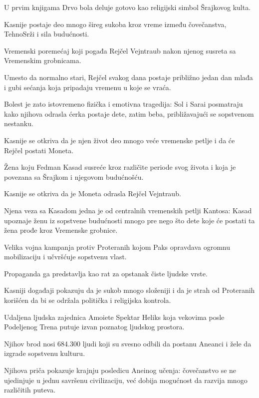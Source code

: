 \begin{description}
  U prvim knjigama Drvo bola deluje gotovo kao religijski simbol Šrajkovog kulta.

  Kasnije postaje deo mnogo šireg sukoba kroz vreme između čovečanstva, TehnoSrži i sila budućnosti.


  \item[Merlinova bolest]
  Vremenski poremećaj koji pogađa Rejčel Vejntraub nakon njenog susreta sa Vremenskim grobnicama.

  Umesto da normalno stari, Rejčel svakog dana postaje približno jedan dan mlađa i gubi sećanja koja pripadaju vremenu u koje se vraća.

  Bolest je zato istovremeno fizička i emotivna tragedija: Sol i Sarai posmatraju kako njihova odrasla ćerka postaje dete, zatim beba, približavajući se sopstvenom nestanku.

  Kasnije se otkriva da je njen život deo mnogo veće vremenske petlje i da će Rejčel postati Moneta.


  \item[Moneta]
  Žena koju Fedman Kasad susreće kroz različite periode svog života i koja je povezana sa Šrajkom i njegovom budućnošću.

  Kasnije se otkriva da je Moneta odrasla Rejčel Vejntraub.

  Njena veza sa Kasadom jedna je od centralnih vremenskih petlji Kantosa: Kasad upoznaje ženu iz sopstvene budućnosti mnogo pre nego što dete koje će postati ta žena prođe kroz Vremenske grobnice.


  \item[Krstaški rat Paksa]
  Velika vojna kampanja protiv Proteranih kojom Paks opravdava ogromnu mobilizaciju i učvršćuje sopstvenu vlast.

  Propaganda ga predstavlja kao rat za opstanak čiste ljudske vrste.

  Kasniji događaji pokazuju da je sukob mnogo složeniji i da je strah od Proteranih korišćen da bi se održala politička i religijska kontrola.


  \item[Siročad Heliksa]
  Udaljena ljudska zajednica Amoiete Spektar Heliks koja vekovima posle Podeljenog Trena putuje izvan poznatog ljudskog prostora.

  Njihov brod nosi 684.300 ljudi koji su svesno odbili da postanu Aneanci i žele da izgrade sopstvenu kulturu.

  Njihova priča pokazuje krajnju posledicu Aneinog učenja: čovečanstvo se ne ujedinjuje u jednu savršenu civilizaciju, već dobija mogućnost da razvija mnogo različitih puteva.

\end{description}